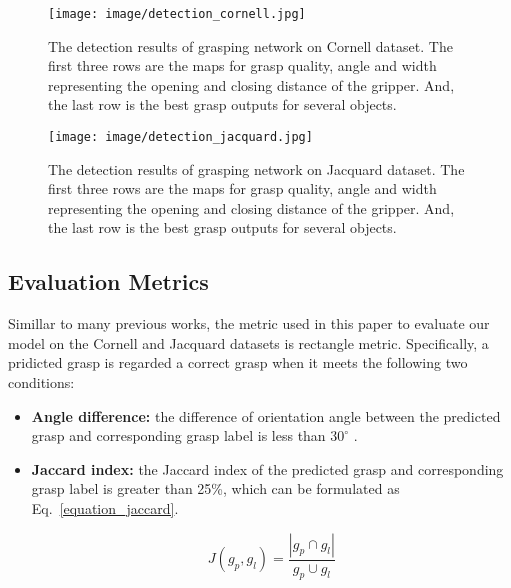 \documentclass[journal]{IEEEtran}
\begin{document}
\begin{figure}[thbp!]
	\centering 
	\setlength{\belowcaptionskip}{-10pt}       
	{\texttt{[image: image/detection\_cornell.jpg]}}
	\caption{The detection results of grasping network on Cornell dataset. The first three rows are the maps for grasp quality, angle and width representing the opening and closing distance of the gripper. And, the last row is the best grasp outputs for several objects.}
	\label{fig:detection_cornell}
\end{figure} 

\begin{figure}[thbp!]
	\centering 
	\setlength{\belowcaptionskip}{-10pt}       
	{\texttt{[image: image/detection\_jacquard.jpg]}}
	\caption{The detection results of grasping network on Jacquard dataset. The first three rows are the maps for grasp quality, angle and width representing the opening and closing distance of the gripper. And, the last row is the best grasp outputs for several objects. }
	\label{fig:detection_jacquard}
\end{figure} 


\subsection{Evaluation Metrics}
\label{metric}

Simillar to many previous works, the metric used in this paper to evaluate our model on the Cornell and Jacquard datasets is rectangle metric. Specifically, a pridicted grasp is regarded a correct grasp when it meets the following two conditions:

\begin{itemize}
	
	\item \textbf{Angle difference:} the difference of orientation angle between the predicted grasp and corresponding grasp label is less than $30^{\circ}$ .
	
	\item \textbf{Jaccard index:}  the Jaccard index of the predicted grasp and corresponding grasp label is greater than 25\%, which can be formulated as Eq.~\ref{equation_jaccard}.
	
	\begin{small}
		\begin{equation}\label{equation_jaccard}
		J(g_p, g_l) = \frac{|g_p \cap g_l|}{g_p \cup g_l}
		\end{equation}
	\end{small}
		
\end{itemize}
\end{document}
